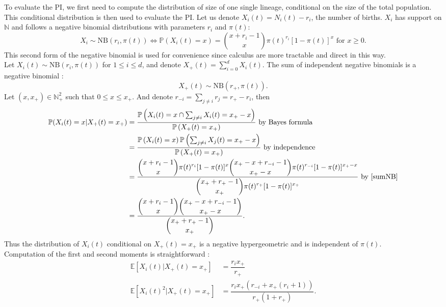 \documentclass{article}
\newcommand{\pr}{{\mathbb{P}}}
\begin{document}
  To evaluate the PI, we first need to compute the distribution of size of one single lineage, conditional on the size of the total population. This conditional distribution is then used to evaluate the PI.
 Let us denote $X_i(t)=N_i(t)-r_i$, the number of births. $X_i$ has support on $\mathbb{N}$ and follows a negative binomial distributions with parameters $r_i$ and $\pi(t)$:
\begin{equation}
X_i \sim \mathrm{NB}(r_i,\pi(t)) \iff \pr(X_i(t)=x)=\binom{x+r_i-1}{x} \pi(t)^{r_i} [1-\pi(t)]^{x} \text{ for } x \geq 0.
\end{equation}
This second form of the negative binomial is used for convenience since calculus are more tractable and direct in this way.\\
Let $X_i(t) \sim \mathrm{NB}(r_i,\pi(t))$ for $1 \leq i \leq d$, and denote $X_+(t)=\sum_{i=0}^d X_i(t)$. The sum of independent negative binomials is a negative binomial \cite{johnson2005univariate}:
\begin{equation}
 X_+(t)  \sim \mathrm{NB} \left( r_+, \pi(t) \right). \label{sumNB}
\end{equation}
Let $(x,x_+) \in \mathbb{N}_+^2$ such that $0 \leq x \leq x_+$. And denote $ \displaystyle r_{-i}=\sum_{j \neq i} r_j=r_+-r_i$, then
\begin{align}
\pr( X_i(t)=x \vert X_+(t)=x_+ ) &=\dfrac{\pr\left( X_i(t)=x \cap \sum_{j \neq i} X_i(t)=x_+-x \right)}{\pr\left(X_+(t)=x_+\right)} \text{ by Bayes formula}\\
 &=\dfrac{\pr\left(X_i(t)=x\right) \pr\left(\sum_{j \neq i} X_j(t)=x_+-x\right)}{\pr\left(X_+(t)=x_+\right)} \text{ by independence}\\
 &=\dfrac{\displaystyle \binom{x+r_i-1}{x} \pi(t)^{r_i} [1-\pi(t)]^{x} \binom{x_+-x+r_{-i}-1}{x_+-x} \pi(t)^{r_{-i}} [1-\pi(t)]^{x_+-x} }{\displaystyle \binom{x_++r_+ -1}{x_+} \pi(t)^{r_+ } [1-\pi(t)]^{x_+}} \text{ by }\eqref{sumNB} \\
 &=\dfrac{\displaystyle \binom{x+r_i-1}{x} \binom{x_+-x+r_{-i}-1}{x_+-x}}{\displaystyle \binom{x_+ +r_+ -1}{x_+}}.
\end{align}
Thus the distribution of $X_i(t)$ conditional on $ X_+(t)=x_+$ is a negative hypergeometric and is independent of $\pi(t)$.\\
Computation of the first and second moments is straightforward \cite[p. 262]{johnson2005univariate}: 
\begin{align}
\mathbb{E} [ X_i(t) \vert X_+(t)=x_+ ] &=\dfrac{r_i x_+}{r_+ } \\
\mathbb{E} [ X_i(t)^2 \vert X_+(t)=x_+ ] &=\dfrac{r_i x_+ (r_{-i} +x_+ (r_i+1))}{r_+ (1+r_+ )}.
\end{align}
\end{document}
